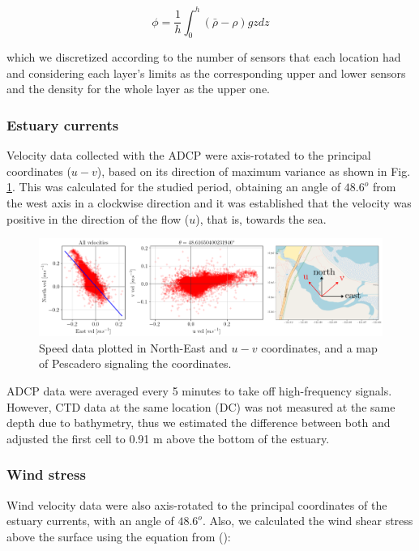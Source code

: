 \documentclass[11pt,letterpaper]{article}
\begin{document}
\begin{equation}
    \phi=\frac{1}{h}\int^h_0(\bar{\rho}-\rho)gzdz
    \label{eq: phi}
\end{equation}

which we discretized according to the number of sensors that each location had and considering each layer's limits as the corresponding upper and lower sensors and the density for the whole layer as the upper one. 

\subsubsection{Estuary currents}

Velocity data collected with the ADCP were axis-rotated to the principal coordinates ($u-v$), based on its direction of maximum variance as shown in Fig. \ref{fig:rotacion}. This was calculated for the studied period, obtaining an angle of $48.6^o$ from the west axis in a clockwise direction and it was established that the velocity was positive in the direction of the flow ($u$), that is, towards the sea.  \\

\begin{figure}[h!]
    \centering
    \includegraphics[width=\textwidth]{Imagenes/rotacion.png}
    \caption{Speed data plotted in North-East and $u-v$ coordinates, and a map of Pescadero signaling the coordinates.}
    \label{fig:rotacion}
\end{figure}

ADCP data were averaged every 5 minutes to take off high-frequency signals. However, CTD data at the same location (DC) was not measured at the same depth due to bathymetry, thus we estimated the difference between both and adjusted the first cell to 0.91 m above the bottom of the estuary. \\

\subsubsection{Wind stress}

Wind velocity data were also axis-rotated to the principal coordinates of the estuary currents, with an angle of $48.6^o$. Also, we calculated the wind shear stress above the surface using the equation from \citeauthor{read2011derivation} (\cite*{read2011derivation}): 
\end{document}
